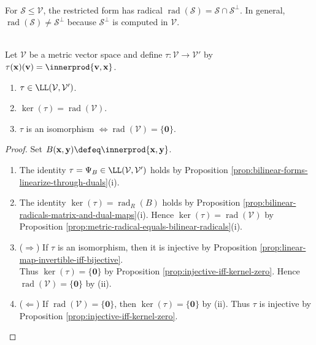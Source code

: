 \begin{remark} \label{rem:subspace-radical-versus-ambient-complement} \\
For $\mathcal{S}\leq\mathcal{V}$, the restricted form has radical $\operatorname{rad}(\mathcal{S})=\mathcal{S}\cap\mathcal{S}^{\perp}$. In general, $\operatorname{rad}(\mathcal{S})\neq\mathcal{S}^{\perp}$ because $\mathcal{S}^{\perp}$ is computed in $\mathcal{V}$.
\end{remark}

\begin{proposition} \label{prop:riesz-map-isomorphism-criterion} \\
Let $\mathcal{V}$ be a metric vector space and define $\tau:\mathcal{V}\to\mathcal{V}'$ by $\tau(\mathbf{x})(\mathbf{v})=\innerprod{\mathbf{v},\mathbf{x}}$.
\begin{enumerate}[label=(\roman*)]
\setlength{\itemsep}{0pt}
\item $\tau\in\LL(\mathcal{V},\mathcal{V}')$.
\item $\ker(\tau)=\operatorname{rad}(\mathcal{V})$.
\item $\tau$ is an isomorphism $\Longleftrightarrow\operatorname{rad}(\mathcal{V})=\{\mathbf{0}\}$.
\end{enumerate}
\begin{proof}
Set $B(\mathbf{x},\mathbf{y})\defeq\innerprod{\mathbf{x},\mathbf{y}}$.
\begin{enumerate}[label=(\roman*)]
\setlength{\itemsep}{0pt}
\item[$(i)$] The identity $\tau=\Psi_B\in\LL(\mathcal{V},\mathcal{V}')$ holds by Proposition \ref{prop:bilinear-forms-linearize-through-duals}(i).
\item[$(ii)$] The identity $\ker(\tau)=\operatorname{rad}_{R}(B)$ holds by Proposition \ref{prop:bilinear-radicals-matrix-and-dual-maps}(i). Hence $\ker(\tau)=\operatorname{rad}(\mathcal{V})$ by Proposition \ref{prop:metric-radical-equals-bilinear-radicals}(i).
\item[$(iii)$] ($\Rightarrow$) If $\tau$ is an isomorphism, then it is injective by Proposition \ref{prop:linear-map-invertible-iff-bijective}.\\
Thus $\ker(\tau)=\{\mathbf{0}\}$ by Proposition \ref{prop:injective-iff-kernel-zero}. Hence $\operatorname{rad}(\mathcal{V})=\{\mathbf{0}\}$ by (ii).
\item[$(iii)$] ($\Leftarrow$) If $\operatorname{rad}(\mathcal{V})=\{\mathbf{0}\}$, then $\ker(\tau)=\{\mathbf{0}\}$ by (ii). Thus $\tau$ is injective by Proposition \ref{prop:injective-iff-kernel-zero}.\\

\end{enumerate}
\end{proof}
\end{proposition}
